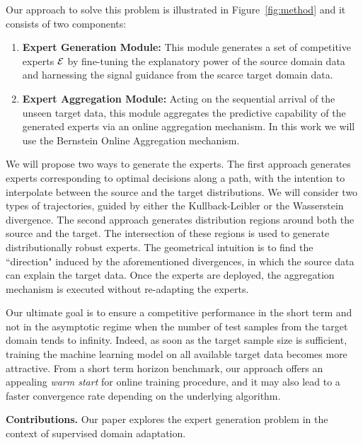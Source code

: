 \documentclass{article}
\begin{document}
    Our approach to solve this problem is illustrated in Figure~\ref{fig:method} and it consists of two components:
    \begin{enumerate}[leftmargin =4mm, itemsep=0.5mm]
\vspace{-.3cm}
        \item \textbf{Expert Generation Module:} This module generates a set of competitive experts $\mathcal E$ by fine-tuning the explanatory power of the source domain data and harnessing the signal guidance from the scarce target domain data.
        \item \textbf{Expert Aggregation Module:} Acting on the sequential arrival of the unseen target data, this module aggregates the predictive capability of the generated experts via an online aggregation mechanism. In this work we will use the Bernstein Online Aggregation mechanism. %
    \end{enumerate}
    
    
 We will propose two ways to generate the experts. The first approach generates experts corresponding to optimal decisions along a path, with the intention to interpolate between the source and the target distributions. We will consider two types of trajectories, guided by either the Kullback-Leibler or the Wasserstein divergence. The second approach generates distribution regions around both the source and the target. The intersection of these regions is used to generate distributionally robust experts. The geometrical intuition is to find the ``direction" induced by the aforementioned divergences, in which the source data can explain the target data. Once the experts are deployed, the aggregation mechanism is executed without re-adapting the experts.
 
   Our ultimate goal is to ensure a competitive performance in the short term and not in the asymptotic regime when the number of test samples from the target domain tends to infinity. Indeed, as soon as the target sample size is sufficient, training the machine learning model on all available target data becomes more attractive. From a short term horizon benchmark, our approach offers an appealing \emph{warm start} for online training procedure, and it may also lead to a faster convergence rate depending on the underlying algorithm.


\textbf{Contributions.}  Our paper explores the expert generation problem in the context of supervised domain adaptation.
\end{document}
